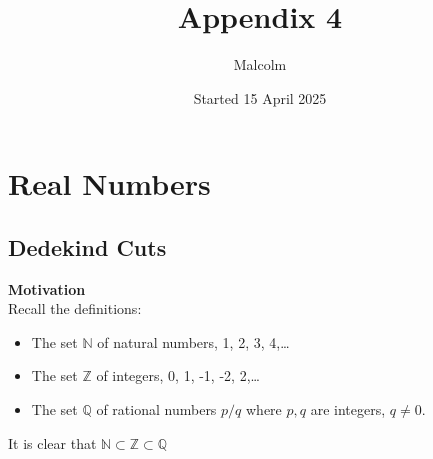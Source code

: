 \documentclass{report}
\title{Appendix 4}
\date{Started 15 April 2025}
\author{Malcolm}
\begin{document}
\maketitle

\tableofcontents

\newpage
\section{Real Numbers}
\subsection{Dedekind Cuts}
\textbf{Motivation}\\
Recall the definitions:
\begin{itemize}
\item The set $\mathbb{N}$ of natural numbers, 1, 2, 3, 4,\ldots
\item The set $\mathbb{Z}$ of integers, 0, 1, -1, -2, 2,\ldots 
\item The set $\mathbb{Q}$ of rational numbers $p/q$ where $p,q$ are integers, $q\neq0$.
\end{itemize}
It is clear that $\mathbb{N}\subset\mathbb{Z}\subset\mathbb{Q}$
\end{document}
